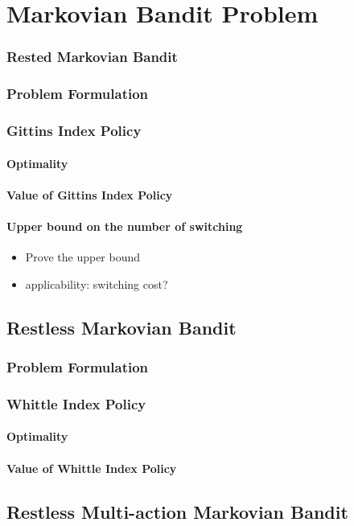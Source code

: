 \chapter{Markovian Bandit Problem}
\label{ch:mab_problem}

\subsection{Rested Markovian Bandit}
\label{sec:rested_mab_pb}

\subsection{Problem Formulation}
\label{subsec:rested_pb_formul}

\subsection{Gittins Index Policy}
\label{subsec:gittins_idx}

\subsubsection{Optimality}

\subsubsection{Value of Gittins Index Policy}

\subsubsection{Upper bound on the number of switching}

\begin{itemize}
    \item Prove the upper bound
    \item applicability: switching cost?
\end{itemize}

\section{Restless Markovian Bandit}
\label{sec:restless_mab_pb}

\subsection{Problem Formulation}
\label{subsec:restless_pb_formul}

\subsection{Whittle Index Policy}
\label{subsec:whittle_idx}

\subsubsection{Optimality}

\subsubsection{Value of Whittle Index Policy}

\section{Restless Multi-action Markovian Bandit}
